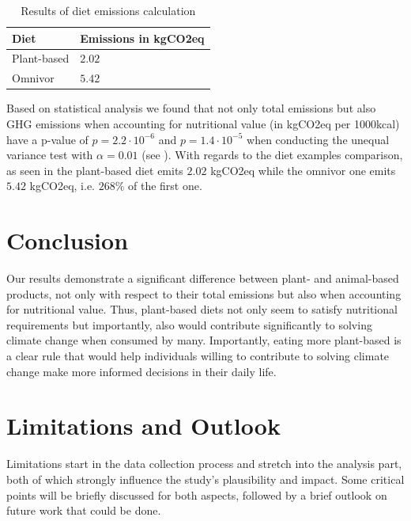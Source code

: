 \documentclass{article}
\begin{document}
\begin{table}[h]
  \caption{Results of diet emissions calculation}
  \label{tbl:results-diets}
  \centering
  \begin{tabular}{ll}
    \toprule
    Diet    & Emissions in kgCO2eq  \\
    \midrule
    Plant-based & $2.02$\\
    Omnivor    &  $5.42$\\
    \bottomrule
  \end{tabular}
\end{table}

Based on statistical analysis we found that not only total emissions but also GHG emissions when accounting for nutritional value (in kgCO2eq per 1000kcal) have a p-value of  $p= 2.2\cdot10^{-6} $  and $p= 1.4\cdot10^{-5}$  when conducting the unequal variance test with $\alpha = 0.01$ (see ). With regards to the diet examples comparison, as seen in  the plant-based diet emits $2.02$ kgCO2eq while the omnivor one emits $5.42$ kgCO2eq, i.e. $268\%$ of the first one.

\section{Conclusion}
\label{conclusion}
Our results demonstrate a significant difference between plant- and animal-based products, not only with respect to their total emissions but also when accounting for nutritional value. Thus, plant-based diets not only seem to satisfy nutritional requirements \cite{WHO2021} but importantly, also would contribute significantly to solving climate change when consumed by many. Importantly, eating more plant-based is a clear rule that would help individuals willing to contribute to solving climate change make more informed decisions in their daily life. 

\section{Limitations and Outlook}
\label{limitations}
Limitations start in the data collection process and stretch into the analysis part, both of which strongly influence the study's plausibility and impact. Some critical points will be briefly discussed for both aspects, followed by  a brief outlook on future work that could be done.
\end{document}
